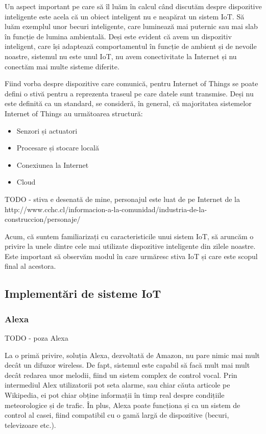 Un aspect important pe care să îl luăm în calcul când discutăm despre
dispozitive inteligente este acela că un obiect inteligent nu e neapărat un
sistem IoT. Să luăm exemplul unor becuri inteligente, care luminează mai
puternic sau mai slab în funcție de lumina ambientală. Deși este evident că avem
un dispozitiv inteligent, care își adaptează comportamentul în funcție de
ambient și de nevoile noastre, sistemul nu este unul IoT, nu avem conectivitate
la Internet și nu conectăm mai multe sisteme diferite.

Fiind vorba despre dispozitive care comunică, pentru Internet of Things se poate
defini o stivă pentru a reprezenta traseul pe care datele sunt transmise. Deși
nu este definită ca un standard, se consideră, în general, că majoritatea
sistemelor Internet of Things au următoarea structură:

\begin{itemize}
	\item Senzori și actuatori
	\item Procesare și stocare locală
	\item Conexiunea la Internet
	\item Cloud
\end{itemize}

TODO - stiva e desenată de mine, personajul este luat de pe Internet de la
http://www.cchc.cl/informacion-a-la-comunidad/industria-de-la-construccion/personaje/ 

Acum, că suntem familiarizați cu caracteristicile unui sistem IoT, să aruncăm o
privire la unele dintre cele mai utilizate dispozitive inteligente din zilele
noastre. Este important să observăm modul în care urmăresc stiva IoT și care
este scopul final al acestora.

\subsection{Implementări de sisteme IoT}
\label{sec:embed-iot-impl}

\subsubsection{Alexa}
\label{sec:embed-iot-impl-alexa}

TODO - poza Alexa

La o primă privire, soluția Alexa, dezvoltată de Amazon, nu pare nimic mai mult
decât un difuzor wireless. De fapt, sistemul este capabil să facă mult mai mult
decât redarea unor melodii, fiind un sistem complex de control vocal. Prin
intermediul Alex utilizatorii pot seta alarme, sau chiar căuta articole pe
Wikipedia, ei pot chiar obține informații în timp real despre condițiile
meteorologice și de trafic. În plus, Alexa poate funcționa și ca un sistem de
control al casei, fiind compatibil cu o gamă largă de dispozitive (becuri,
televizoare etc.).

